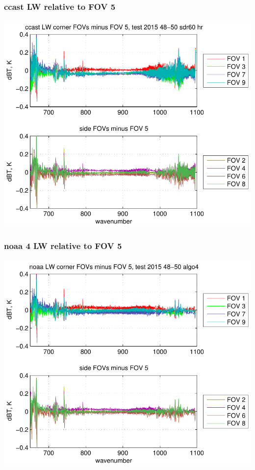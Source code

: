 \documentclass[11pt]{beamer}
\begin{document}
\begin{frame}
\frametitle{ccast LW relative to FOV 5}
\begin{center}
  \includegraphics[scale=0.7]{figures/ccast_LW_dif_2015_48-50_sdr60_hr.pdf}
\end{center}
\end{frame}
\begin{frame}
\frametitle{noaa 4 LW relative to FOV 5}
\begin{center}
  \includegraphics[scale=0.7]{figures/noaa_LW_dif_2015_48-50_algo4.pdf}
\end{center}
\end{frame}
\end{document}

